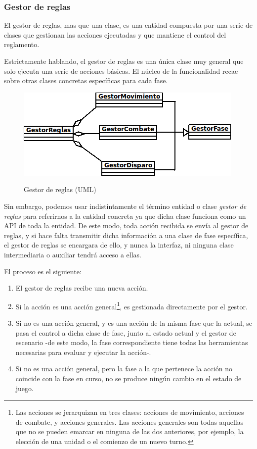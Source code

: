 \subsubsection{Gestor de reglas}
El gestor de reglas, mas que una clase, es una entidad compuesta por
una serie de clases que gestionan las acciones ejecutadas y
que mantiene el control del reglamento.

Estrictamente hablando, el gestor de reglas es una única clase muy
general que solo ejecuta una serie de acciones básicas. El núcleo de
la funcionalidad recae sobre otras clases concretas específicas para
cada fase.

\begin{figure}[h]
\centering
\includegraphics[scale=.8]{./imagenes/Reglas.png}
\label{fig:reglas}
\caption{Gestor de reglas (UML)}
\end{figure}

Sin embargo, podemos usar indistintamente el término entidad o clase
\emph{gestor de reglas} para referirnos a la entidad concreta ya que
dicha clase funciona como un API de toda la entidad. De este modo,
toda acción recibida se envía al gestor de reglas, y si hace falta
transmitir dicha información a una clase de fase específica, el gestor
de reglas se encargara de ello, y nunca la interfaz, ni ninguna clase
intermediaria o auxiliar tendrá acceso a ellas.

El proceso es el siguiente:
\begin{enumerate}
\item El gestor de reglas recibe una nueva acción.
\item Si la acción es una acción general\footnote{Las acciones se
    jerarquizan en tres clases: acciones de movimiento, acciones de
    combate, y acciones generales. Las acciones generales son todas
    aquellas que no se pueden emarcar en ninguna de las dos
    anteriores, por ejemplo, la elección de una unidad o el comienzo
    de un nuevo turno.}, es gestionada directamente por el gestor.
\item Si no es una acción general, y es una acción de la misma fase
  que la actual, se pasa el control a dicha clase de fase, junto al
  estado actual y el gestor de escenario -de este modo, la fase
  correspondiente tiene todas las herramientas necesarias para
  evaluar y ejecutar la acción-.
\item Si no es una acción general, pero la fase a la que pertenece la
  acción no coincide con la fase en curso, no se produce ningún cambio
  en el estado de juego.
\end{enumerate}

